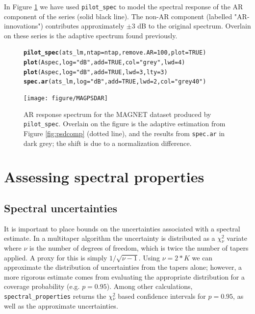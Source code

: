 \documentclass[10pt]{article}\usepackage{graphicx, color}
\makeatletter
\newcommand{\hlfunctioncall}[1]{\textcolor[rgb]{0.501960784313725,0,0.329411764705882}{\textbf{#1}}}%
\newcommand{\hlstring}[1]{\textcolor[rgb]{0.6,0.6,1}{#1}}%
\newenvironment{kframe}{%
 \def\at@end@of@kframe{}%
 \ifinner\ifhmode%
  \def\at@end@of@kframe{\end{minipage}}%
  \begin{minipage}{\columnwidth}%
 \fi\fi%
 \def\FrameCommand##1{\hskip\@totalleftmargin \hskip-\fboxsep
 \colorbox{shadecolor}{##1}\hskip-\fboxsep
     \hskip-\linewidth \hskip-\@totalleftmargin \hskip\columnwidth}%
 \MakeFramed {\advance\hsize-\width
   \@totalleftmargin\z@ \linewidth\hsize
   \@setminipage}}%
 {\par\unskip\endMakeFramed%
 \at@end@of@kframe}
\newenvironment{knitrout}{}{} %
\newcommand{\Rcmd}[1]{\texttt{#1}}
\makeatother
\begin{document}
In Figure \ref{fig:arspecvar} we have used \Rcmd{pilot\_spec} to 
model the spectral response of the AR component of the series (solid
black line).
The non-AR component (labelled "AR-innovations")
contributes approximately $\pm 3$ dB to the original spectrum.
Overlain on these series is the adaptive spectrum found previously.

\begin{figure}[htb!]
\begin{center}
\begin{knitrout}
\color{fgcolor}\begin{kframe}
\begin{alltt}
\hlfunctioncall{pilot_spec}(ats_lm, ntap = ntap, remove.AR = 100, plot = TRUE)
\hlfunctioncall{plot}(Aspec, log = \hlstring{"dB"}, add = TRUE, col = \hlstring{"grey"}, lwd = 4)
\hlfunctioncall{plot}(Aspec, log = \hlstring{"dB"}, add = TRUE, lwd = 3, lty = 3)
\hlfunctioncall{spec.ar}(ats_lm, log = \hlstring{"dB"}, add = TRUE, lwd = 2, col = \hlstring{"grey40"})
\end{alltt}
\end{kframe}
\texttt{[image: figure/MAGPSDAR]} 

\end{knitrout}

\caption{AR response spectrum for the MAGNET dataset produced by 
\Rcmd{pilot\_spec}. Overlain on the figure is the adaptive estimation 
from Figure \ref{fig:psdcomp} (dotted line),
and the results from \Rcmd{spec.ar} in dark grey; the shift is due to a
normalization difference.}
\label{fig:arspecvar}
\end{center}
\end{figure}

\section{Assessing spectral properties}
\subsection{Spectral uncertainties}
It is important to place bounds on the uncertainties associated
with a spectral estimate.
In a multitaper algorithm the uncertainty is distributed as
a $\chi{}_{\nu}^2$ variate where $\nu$ is
the number of degrees of freedom, which is twice the
number of tapers applied.
A proxy for this is simply $1/\sqrt{\nu - 1}$.
Using $\nu = 2*K$ we can approximate the distribution
of uncertainties from the tapers alone; however, a more
rigorous estimate comes from evaluating the appropriate 
distribution  for a coverage probability (e.g. $p=0.95$).
Among other calculations, \Rcmd{spectral\_properties} returns the 
$\chi{}_{\nu}^2$ based confidence intervals for $p=0.95$, as well as the
approximate uncertainties.  
\end{document}
